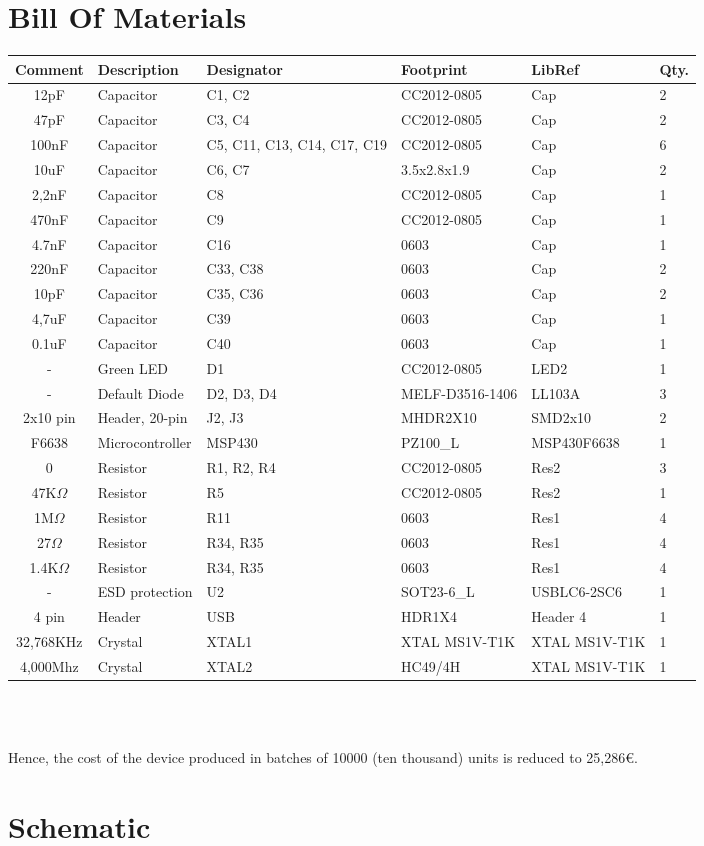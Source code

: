\section{Bill Of Materials}
{\footnotesize
\begin{tabular}{| c |l | p{1.5cm} | l | l | l |} 
	\hline
		Comment & Description & Designator & Footprint & LibRef & Qty.\\ \hline
		12pF & Capacitor & C1, C2 & CC2012-0805 & Cap & 2\\ \hline
		47pF & Capacitor & C3, C4 & CC2012-0805 & Cap & 2\\ \hline
		100nF & Capacitor & C5, C11, C13, C14, C17, C19 & CC2012-0805 & Cap & 6\\ \hline
		10uF & Capacitor & C6, C7 & 3.5x2.8x1.9 & Cap & 2\\ \hline
		2,2nF & Capacitor & C8 & CC2012-0805 & Cap & 1\\ \hline
		470nF & Capacitor & C9 & CC2012-0805 & Cap & 1\\ \hline
		4.7nF & Capacitor & C16 & 0603 & Cap & 1\\ \hline
		220nF & Capacitor & C33, C38 & 0603 & Cap & 2\\ \hline
		10pF & Capacitor & C35, C36 & 0603 & Cap & 2\\ \hline
		4,7uF & Capacitor & C39 & 0603 & Cap & 1\\ \hline
		0.1uF & Capacitor & C40 & 0603 & Cap & 1\\ \hline
		- & Green LED & D1 & CC2012-0805 & LED2 & 1\\ \hline
		- & Default Diode & D2, D3, D4 & MELF-D3516-1406 &  LL103A & 3\\ \hline
		2x10 pin & Header, 20-pin & J2, J3 & MHDR2X10 & SMD2x10 & 2\\ \hline
		F6638 & Microcontroller & MSP430 & PZ100\_L & MSP430F6638 & 1\\ \hline
		0 & Resistor & R1, R2, R4 & CC2012-0805 & Res2 & 3\\ \hline
		47K$\Omega$ & Resistor & R5 & CC2012-0805 & Res2 & 1\\ \hline
		1M$\Omega$ & Resistor & R11 & 0603 & Res1 & 4\\ \hline
		27$\Omega$ & Resistor & R34, R35 & 0603 & Res1 & 4\\ \hline
		1.4K$\Omega$ & Resistor & R34, R35 & 0603 & Res1 & 4\\ \hline
		- & ESD protection & U2 & SOT23-6\_L & USBLC6-2SC6 & 1\\ \hline
		4 pin & Header & USB & HDR1X4 & Header 4 & 1\\ \hline
		32,768KHz & Crystal & XTAL1 & XTAL MS1V-T1K & XTAL MS1V-T1K & 1\\ \hline
		4,000Mhz & Crystal	& XTAL2 & HC49/4H & XTAL MS1V-T1K & 1\\ \hline
\end{tabular}\\\\
}

	Hence, the cost of the device produced in batches of 10000 (ten thousand) units is reduced to 25,286{\small \euro}.
\section{Schematic}









